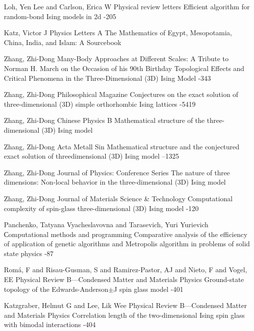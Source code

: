 \documentclass[10pt]{article}
\begin{document}
\begin{thebibliography}{20}
		\by Loh, Yen Lee and Carlson, Erica W
		\jour Physical review letters
		\paper Efficient algorithm for random-bond Ising models in 2d
		-205
		
		\by Katz, Victor J
		\jour Physics Letters A
		\paper The Mathematics of Egypt, Mesopotamia, China, India, and Islam: A Sourcebook
		
		\by Zhang, Zhi-Dong
		\jour Many-Body Approaches at Different Scales: A Tribute to Norman H. March on the Occasion of his 90th Birthday
		\paper Topological Effects and Critical Phenomena in the Three-Dimensional (3D) Ising Model
		-343
		
		\by Zhang, Zhi-Dong
		\jour Philosophical Magazine
		\paper Conjectures on the exact solution of three-dimensional (3D) simple orthorhombic Ising lattices
		-5419
		
		\by Zhang, Zhi-Dong
		\jour Chinese Physics B
		\paper Mathematical structure of the three-dimensional (3D) Ising model
		
		\by Zhang, Zhi-Dong
		\jour Acta Metall Sin
		\paper Mathematical structure and the conjectured exact solution of threedimensional (3D) Ising model
		--1325
		
		\by Zhang, Zhi-Dong
		\jour Journal of Physics: Conference Series
		\paper The nature of three dimensions: Non-local behavior in the three-dimensional (3D) Ising model
		
		\by Zhang, Zhi-Dong
		\jour Journal of Materials Science \& Technology
		\paper Computational complexity of spin-glass three-dimensional (3D) Ising model
		-120
		
		\by Panchenko, Tatyana Vyacheslavovna and Tarasevich, Yuri Yurievich
		\jour Сomputational methods and programming
		\paper Comparative analysis of the efficiency of application of genetic algorithms and Metropolis algorithm in problems of solid state physics
		-87
		
		
		
		\by Rom{\'a}, F and Risau-Gusman, S and Ramirez-Pastor, AJ and Nieto, F and Vogel, EE
		\jour Physical Review B—Condensed Matter and Materials Physics
		\paper Ground-state topology of the Edwards-Anderson$\pm$J spin glass model
		-401
		
		\by Katzgraber, Helmut G and Lee, Lik Wee
		\jour Physical Review B—Condensed Matter and Materials Physics
		\paper Correlation length of the two-dimensional Ising spin glass with bimodal interactions
		-404
		
	\end{thebibliography}
	
	
	
	\EndArticle
\end{document}
